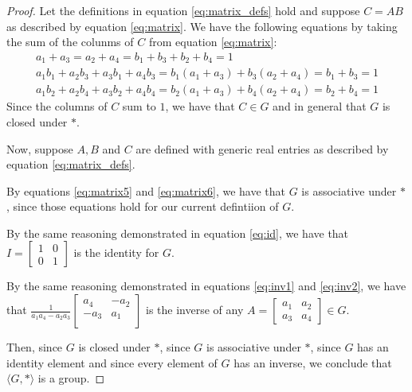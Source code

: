 \documentclass[12pt]{article}
\newcommand{\ainverse}{\frac{1}{a_1 a_4 - a_2 a_3}\begin{bmatrix} a_4 & -a_2 \\ -a_3 & a_1 \\ \end{bmatrix}}
\begin{document}
\begin{proof}
	Let the definitions in equation \ref{eq:matrix_defs} hold and suppose $C = AB$ as described by equation \ref{eq:matrix}. We have the following equations by taking the sum of the colunms of $C$ from equation \ref{eq:matrix}:
	\begin{align}
		a_1 + a_3 = a_2 + a_4 = b_1 + b_3 + b_2 + b_4 = 1 \\
		a_1 b_1 + a_2 b_3 + a_3 b_1 + a_4 b_3 = b_1(a_1+a_3) + b_3(a_2+a_4) = b_1 + b_3 = 1 \\
		a_1 b_2 + a_2 b_4 + a_3 b_2 + a_4 b_4 = b_2(a_1+a_3) + b_4(a_2+a_4) = b_2 + b_4 = 1
	\end{align}
	Since the columns of $C$ sum to $1$, we have that $C \in G$ and in general that $G$ is closed under $*$.

	Now, suppose $A,B$ and $C$ are defined with generic real entries as described by equation \ref{eq:matrix_defs}.

By equations \ref{eq:matrix5} and \ref{eq:matrix6}, we have that $G$ is associative under $*$, since those equations hold for our current defintiion of $G$.

By the same reasoning demonstrated in equation \ref{eq:id}, we have that $I = \begin{bmatrix} 1 & 0 \\ 0 & 1 \end{bmatrix}$ is the identity for $G$.

By the same reasoning demonstrated in equations \ref{eq:inv1} and \ref{eq:inv2}, we have that $\ainverse$ is the inverse of any $A = \begin{bmatrix} a_1 & a_2 \\ a_3 & a_4 \end{bmatrix} \in G$.

Then, since $G$ is closed under $*$, since $G$ is associative under $*$, since $G$ has an identity element and since every element of $G$ has an inverse, we conclude that $\langle G, * \rangle$ is a group.

\end{proof}

\pagebreak
\end{document}

